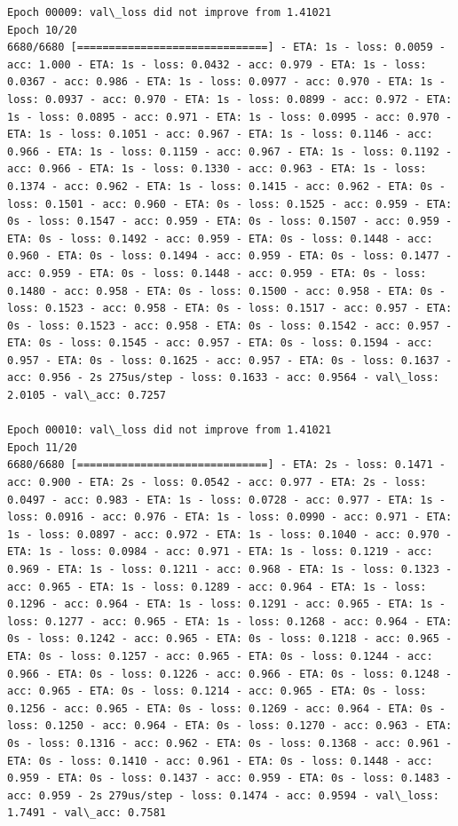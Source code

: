 \documentclass[11pt]{article}
\begin{document}
\begin{Verbatim}[commandchars=\\\{\}]
Epoch 00009: val\_loss did not improve from 1.41021
Epoch 10/20
6680/6680 [==============================] - ETA: 1s - loss: 0.0059 - acc: 1.000 - ETA: 1s - loss: 0.0432 - acc: 0.979 - ETA: 1s - loss: 0.0367 - acc: 0.986 - ETA: 1s - loss: 0.0977 - acc: 0.970 - ETA: 1s - loss: 0.0937 - acc: 0.970 - ETA: 1s - loss: 0.0899 - acc: 0.972 - ETA: 1s - loss: 0.0895 - acc: 0.971 - ETA: 1s - loss: 0.0995 - acc: 0.970 - ETA: 1s - loss: 0.1051 - acc: 0.967 - ETA: 1s - loss: 0.1146 - acc: 0.966 - ETA: 1s - loss: 0.1159 - acc: 0.967 - ETA: 1s - loss: 0.1192 - acc: 0.966 - ETA: 1s - loss: 0.1330 - acc: 0.963 - ETA: 1s - loss: 0.1374 - acc: 0.962 - ETA: 1s - loss: 0.1415 - acc: 0.962 - ETA: 0s - loss: 0.1501 - acc: 0.960 - ETA: 0s - loss: 0.1525 - acc: 0.959 - ETA: 0s - loss: 0.1547 - acc: 0.959 - ETA: 0s - loss: 0.1507 - acc: 0.959 - ETA: 0s - loss: 0.1492 - acc: 0.959 - ETA: 0s - loss: 0.1448 - acc: 0.960 - ETA: 0s - loss: 0.1494 - acc: 0.959 - ETA: 0s - loss: 0.1477 - acc: 0.959 - ETA: 0s - loss: 0.1448 - acc: 0.959 - ETA: 0s - loss: 0.1480 - acc: 0.958 - ETA: 0s - loss: 0.1500 - acc: 0.958 - ETA: 0s - loss: 0.1523 - acc: 0.958 - ETA: 0s - loss: 0.1517 - acc: 0.957 - ETA: 0s - loss: 0.1523 - acc: 0.958 - ETA: 0s - loss: 0.1542 - acc: 0.957 - ETA: 0s - loss: 0.1545 - acc: 0.957 - ETA: 0s - loss: 0.1594 - acc: 0.957 - ETA: 0s - loss: 0.1625 - acc: 0.957 - ETA: 0s - loss: 0.1637 - acc: 0.956 - 2s 275us/step - loss: 0.1633 - acc: 0.9564 - val\_loss: 2.0105 - val\_acc: 0.7257

Epoch 00010: val\_loss did not improve from 1.41021
Epoch 11/20
6680/6680 [==============================] - ETA: 2s - loss: 0.1471 - acc: 0.900 - ETA: 2s - loss: 0.0542 - acc: 0.977 - ETA: 2s - loss: 0.0497 - acc: 0.983 - ETA: 1s - loss: 0.0728 - acc: 0.977 - ETA: 1s - loss: 0.0916 - acc: 0.976 - ETA: 1s - loss: 0.0990 - acc: 0.971 - ETA: 1s - loss: 0.0897 - acc: 0.972 - ETA: 1s - loss: 0.1040 - acc: 0.970 - ETA: 1s - loss: 0.0984 - acc: 0.971 - ETA: 1s - loss: 0.1219 - acc: 0.969 - ETA: 1s - loss: 0.1211 - acc: 0.968 - ETA: 1s - loss: 0.1323 - acc: 0.965 - ETA: 1s - loss: 0.1289 - acc: 0.964 - ETA: 1s - loss: 0.1296 - acc: 0.964 - ETA: 1s - loss: 0.1291 - acc: 0.965 - ETA: 1s - loss: 0.1277 - acc: 0.965 - ETA: 1s - loss: 0.1268 - acc: 0.964 - ETA: 0s - loss: 0.1242 - acc: 0.965 - ETA: 0s - loss: 0.1218 - acc: 0.965 - ETA: 0s - loss: 0.1257 - acc: 0.965 - ETA: 0s - loss: 0.1244 - acc: 0.966 - ETA: 0s - loss: 0.1226 - acc: 0.966 - ETA: 0s - loss: 0.1248 - acc: 0.965 - ETA: 0s - loss: 0.1214 - acc: 0.965 - ETA: 0s - loss: 0.1256 - acc: 0.965 - ETA: 0s - loss: 0.1269 - acc: 0.964 - ETA: 0s - loss: 0.1250 - acc: 0.964 - ETA: 0s - loss: 0.1270 - acc: 0.963 - ETA: 0s - loss: 0.1316 - acc: 0.962 - ETA: 0s - loss: 0.1368 - acc: 0.961 - ETA: 0s - loss: 0.1410 - acc: 0.961 - ETA: 0s - loss: 0.1448 - acc: 0.959 - ETA: 0s - loss: 0.1437 - acc: 0.959 - ETA: 0s - loss: 0.1483 - acc: 0.959 - 2s 279us/step - loss: 0.1474 - acc: 0.9594 - val\_loss: 1.7491 - val\_acc: 0.7581


\end{Verbatim}
\end{document}
